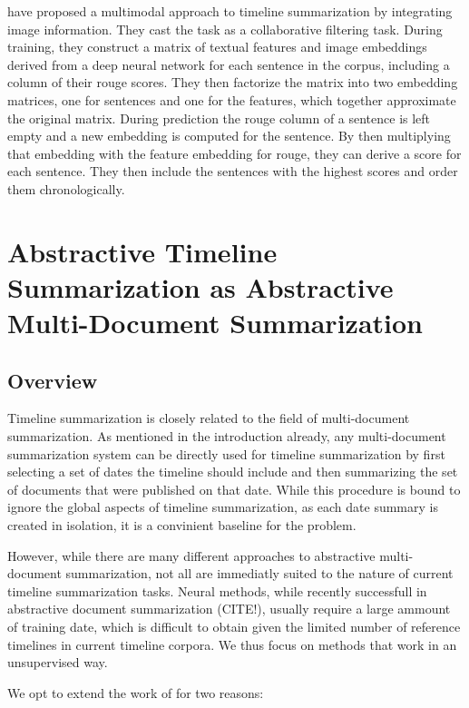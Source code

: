 \documentclass[a4paper,BCOR=10mm]{report}
\begin{document}
\citet{multimodal} have proposed a multimodal approach to timeline summarization by integrating image information. They cast the task as a collaborative filtering task. During training, they construct a matrix of textual features and image embeddings derived from a deep neural network for each sentence in the corpus, including a column of their rouge scores. They then factorize the matrix into two embedding matrices, one for sentences and one for the features, which together approximate the original matrix. During prediction the rouge column of a sentence is left empty and a new embedding is computed for the sentence. By then multiplying that embedding with the feature embedding for rouge, they can derive a score for each sentence. They then include the sentences with the highest scores and order them chronologically.




\chapter{Abstractive Timeline Summarization as Abstractive Multi-Document Summarization}

\section{Overview}

Timeline summarization is closely related to the field of multi-document summarization. As mentioned in the introduction already, any multi-document summarization system can be directly used for timeline summarization by first selecting a set of dates the timeline should include and then summarizing the set of documents that were published on that date.
While this procedure is bound to ignore the global aspects of timeline summarization, as each date summary is created in isolation, it is a convinient baseline for the problem.

However, while there are many different approaches to abstractive multi-document summarization, not all are immediatly suited to the nature of current timeline summarization tasks. Neural methods, while recently successfull in abstractive document summarization (CITE!), usually require a large ammount of training date, which is difficult to obtain given the limited number of reference timelines in current timeline corpora.
We thus focus on methods that work in an unsupervised way.

We opt to extend the work of \citep{banerjee} for two reasons:
\end{document}
